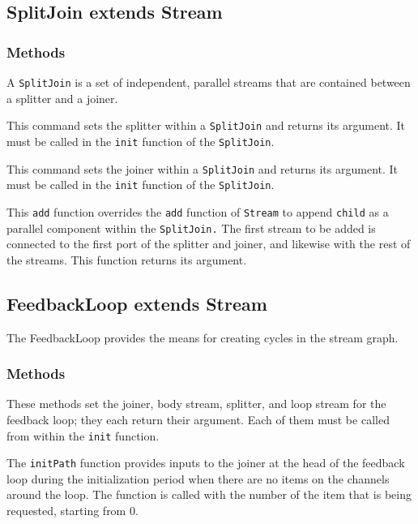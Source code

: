 \subsection{SplitJoin extends Stream}

\subsubsection{Methods}

A {\tt SplitJoin} is a set of independent, parallel streams that are
contained between a splitter and a joiner.

  This command sets the splitter within a {\tt SplitJoin} and returns its argument.  It must be called in the {\tt init} function of the {\tt SplitJoin}.

 This command sets the joiner within a {\tt SplitJoin} and returns its argument.  It must be called in the {\tt init} function of the {\tt SplitJoin}.

 This {\tt add} function overrides the {\tt add} function of {\tt Stream} to append {\tt child} as a parallel component within the {\tt SplitJoin.}  The first stream to be added is connected to the first port of the splitter and joiner, and likewise with the rest of the streams.  This function returns its argument.

\subsection{FeedbackLoop extends Stream}

The FeedbackLoop provides the means for creating cycles in the stream
graph.

\subsubsection{Methods}

 These methods set the joiner, body
stream, splitter, and loop stream for the feedback loop; they each
return their argument.  Each of them must be called from within the
{\tt init} function.

  The {\tt initPath} function provides inputs to the joiner at the head of the feedback loop during the initialization period when there are no items on the channels around the loop.  The function is called with the number of the item that is being requested, starting from 0.

